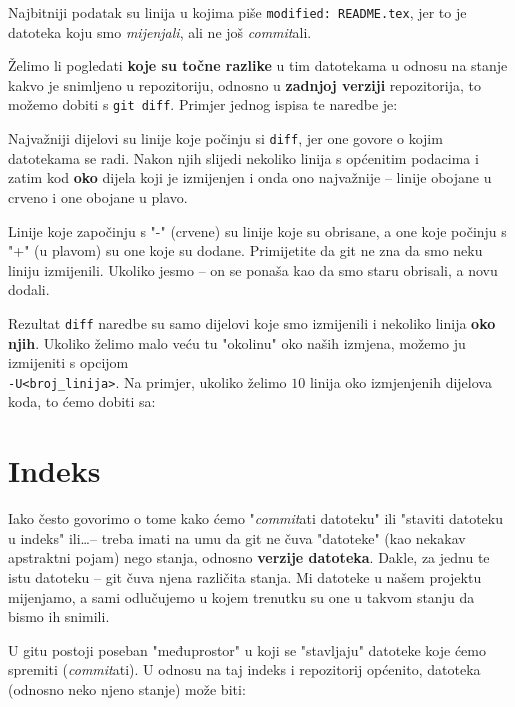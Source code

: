 

Najbitniji podatak su linija u kojima piše \verb+modified: README.tex+, jer to je datoteka koju smo \emph{mijenjali}, ali ne još \emph{commit}ali.

Želimo li pogledati \textbf{koje su točne razlike} u tim datotekama u odnosu na stanje kakvo je snimljeno u repozitoriju, odnosno u \textbf{zadnjoj verziji} repozitorija, to možemo dobiti s \verb+git diff+. 
Primjer jednog ispisa te naredbe je:



Najvažniji dijelovi su linije koje počinju si \verb+diff+, jer one govore o kojim datotekama se radi.
Nakon njih slijedi nekoliko linija s općenitim podacima i zatim kod \textbf{oko} dijela koji je izmijenjen i onda ono najvažnije -- linije obojane u crveno i one obojane u plavo.

Linije koje započinju s "-" (crvene) su linije koje su obrisane, a one koje počinju s "+" (u plavom) su one koje su dodane. 
Primijetite da git ne zna da smo neku liniju izmijenili. 
Ukoliko jesmo -- on se ponaša kao da smo staru obrisali, a novu dodali.

Rezultat \verb+diff+ naredbe su samo dijelovi koje smo izmijenili i nekoliko linija \textbf{oko njih}.
Ukoliko želimo malo veću tu "okolinu" oko naših izmjena, možemo ju izmijeniti s opcijom \\ \verb+-U<broj_linija>+.
Na primjer, ukoliko želimo $10$ linija oko izmjenjenih dijelova koda, to ćemo dobiti sa:


\section*{Indeks}

Iako često govorimo o tome kako ćemo "\emph{commit}ati datoteku" ili "staviti datoteku u indeks" ili\dots -- treba imati na umu da git ne čuva "datoteke" (kao nekakav apstraktni pojam) nego stanja, odnosno \textbf{verzije datoteka}.
Dakle, za jednu te istu datoteku -- git čuva njena različita stanja.
Mi datoteke u našem projektu mijenjamo, a sami odlučujemo u kojem trenutku su one u takvom stanju da bismo ih snimili.

U gitu postoji poseban "međuprostor" u koji se "stavljaju" datoteke koje ćemo spremiti (\emph{commit}ati).
U odnosu na taj indeks i repozitorij općenito, datoteka (odnosno neko njeno stanje) može biti:

